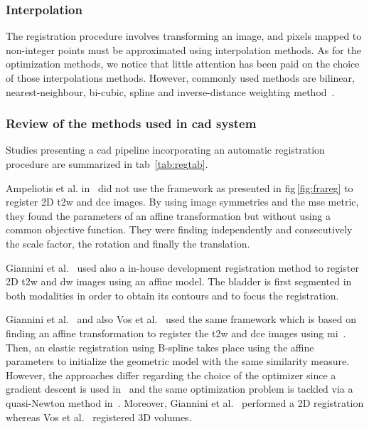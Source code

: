 \subsubsection{Interpolation}\label{subsubsec:int}

The registration procedure involves transforming an image, and pixels mapped to non-integer points must be approximated using interpolation methods. As for the optimization methods, we notice that little attention has been paid on the choice of those interpolations methods. However, commonly used methods are bilinear, nearest-neighbour, bi-cubic, spline and inverse-distance weighting method~\cite{Mitra2012}.

\subsubsection{Review of the methods used in \ac{cad} system}\label{subsubsec:regrev}

Studies presenting a \ac{cad} pipeline incorporating an automatic registration procedure are summarized in \ac{tab}~\ref{tab:regtab}. 

Ampeliotis et al. in~\cite{Ampeliotis2007,Ampeliotis2008} did not use the framework as presented in \ac{fig}\,\ref{fig:frareg} to register 2D \ac{t2w} and \ac{dce} images. By using image symmetries and the \ac{mse} metric, they found the parameters of an affine transformation but without using a common objective function. They were finding independently and consecutively the scale factor, the rotation and finally the translation.

Giannini et al.~\cite{Giannini2013} used also a in-house development registration method to register 2D \ac{t2w} and \ac{dw} images using an affine model. The bladder is first segmented in both modalities in order to obtain its contours and to focus the registration.

Giannini et al.~\cite{Giannini2013} and also Vos et al.~\cite{Vos2010} used the same framework which is based on finding an affine transformation to register the \ac{t2w} and \ac{dce} images using \ac{mi}~\cite{Rueckert1999}. Then, an elastic registration using B-spline takes place using the affine parameters to initialize the geometric model with the  same similarity measure. However, the approaches differ regarding the choice of the optimizer since a gradient descent is used in~\cite{Giannini2013} and the same optimization problem is tackled via a quasi-Newton method in~\cite{Vos2010}. Moreover, Giannini et al.~\cite{Giannini2013} performed a 2D registration whereas Vos et al.~\cite{Vos2010} registered 3D volumes.


